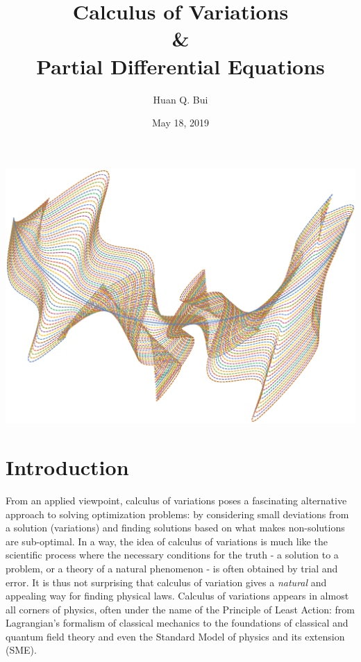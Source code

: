 \documentclass{article}
\title{\textbf{Calculus of Variations}\\\textbf{\&}\\\textbf{Partial Differential Equations}}
\author{Huan Q. Bui}
\date{May 18, 2019}
\begin{document}
\maketitle
\begin{center}
\includegraphics[scale=0.55,angle=270]{intro.eps}
\end{center}



\newpage
\tableofcontents
\newpage
{}





\section{Introduction}

\noindent From an applied viewpoint, calculus of variations poses a fascinating alternative approach to solving optimization problems: by considering small deviations from a solution (variations) and finding solutions based on what makes non-solutions are sub-optimal. In a way, the idea of calculus of variations is much like the scientific process where the necessary conditions for the truth - a solution to a problem, or a theory of a natural phenomenon - is often obtained by trial and error. It is thus not surprising that calculus of variation gives a \textit{natural} and appealing way for finding physical laws. Calculus of variations appears in almost all corners of physics, often under the name of the Principle of Least Action: from Lagrangian's formalism of classical mechanics to the foundations of classical and quantum field theory and even the Standard Model of physics and its extension (SME). \\
\end{document}
